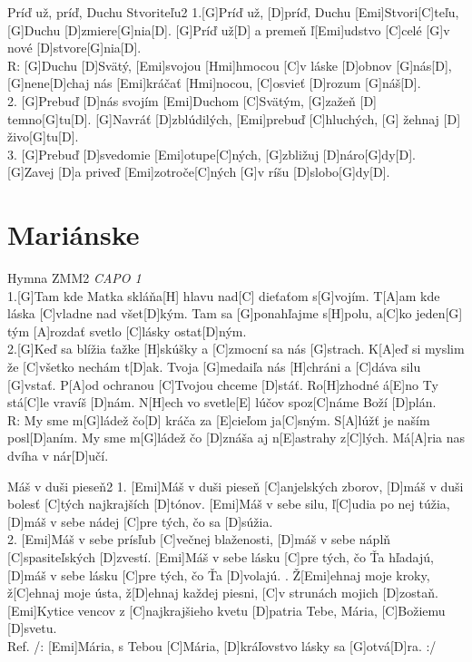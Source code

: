 \documentclass[12pt]{article}
\begin{document}
\begin{song}{Príď už, príď, Duchu Stvoriteľu}{2}
	1.[G]Príď už, [D]príď, Duchu [Emi]Stvori[C]teľu, [G]Duchu [D]zmiere[G]nia[D].
	[G]Príď už[D] a premeň ľ[Emi]udstvo [C]celé [G]v nové [D]stvore[G]nia[D].
	\\
	R: [G]Duchu [D]Svätý, [Emi]svojou [Hmi]hmocou [C]v láske [D]obnov [G]nás[D],
	[G]nene[D]chaj nás [Emi]kráčať [Hmi]nocou, [C]osvieť [D]rozum [G]náš[D].
	\\
	2. [G]Prebuď [D]nás svojím [Emi]Duchom [C]Svätým, [G]zažeň [D] temno[G]tu[D].
	[G]Navráť [D]zblúdilých, [Emi]prebuď [C]hluchých, [G] žehnaj [D] živo[G]tu[D].
	\\
	3. [G]Prebuď [D]svedomie [Emi]otupe[C]ných, [G]zbližuj [D]náro[G]dy[D].
	[G]Zavej [D]a priveď [Emi]zotroče[C]ných [G]v ríšu [D]slobo[G]dy[D].
	\columnbreak
\end{song}

\newpage
\section{Mariánske}

\begin{song}{Hymna ZMM}{2}
	\textit{CAPO 1}\\
	1.[G]Tam kde Matka skláňa[H] hlavu nad[C] dieťaťom s[G]vojím.
	T[A]am kde láska [C]vladne nad všet[D]kým.
	Tam sa [G]ponahľajme s[H]polu, a[C]ko jeden[G] tým
	[A]rozdať svetlo [C]lásky ostat[D]ným.
	\\
	2.[G]Keď sa blížia ťažke [H]skúšky a [C]zmocní sa nás [G]strach.
	K[A]eď si myslim že [C]všetko nechám t[D]ak.
	Tvoja [G]medaiľa nás [H]chráni a [C]dáva silu [G]vstať.
	P[A]od ochranou [C]Tvojou chceme [D]stáť.
	\columnbreak
	Ro[H]zhodné á[E]no Ty stá[C]le vravíš [D]nám.
	N[H]ech vo svetle[E] lúčov spoz[C]náme Boží [D]plán.
	\\
	R: My sme m[G]ládež čo[D] kráča
	za [E]cieľom ja[C]sným.
	S[A]lúžť je naším posl[D]aním.
	My sme m[G]ládež čo [D]znáša 
	aj n[E]astrahy z[C]lých.
	Má[A]ria nas dvíha v nár[D]učí.
\end{song}

\begin{song}{Máš v duši pieseň}{2}
	1. [Emi]Máš v duši pieseň [C]anjelských zborov,
	[D]máš v duši bolesť [C]tých najkrajších [D]tónov.
	[Emi]Máš v sebe silu, ľ[C]udia po nej túžia,
	[D]máš v sebe nádej [C]pre tých, čo sa [D]súžia.
	\\
	2. [Emi]Máš v sebe prísľub [C]večnej blaženosti,
	[D]máš v sebe náplň [C]spasiteľských [D]zvestí.
	[Emi]Máš v sebe lásku [C]pre tých, čo Ťa hľadajú,
	[D]máš v sebe lásku [C]pre tých, čo Ťa [D]volajú.
	. Ž[Emi]ehnaj moje kroky, ž[C]ehnaj moje ústa,
	ž[D]ehnaj každej piesni, 
	[C]v strunách mojich [D]zostaň.
	[Emi]Kytice vencov z [C]najkrajšieho kvetu
	[D]patria Tebe, Mária, [C]Božiemu [D]svetu.
	\\
	Ref. 
	/: [Emi]Mária, s Tebou [C]Mária,
	[D]kráľovstvo lásky sa [G]otvá[D]ra. :/
\end{song}
\end{document}
